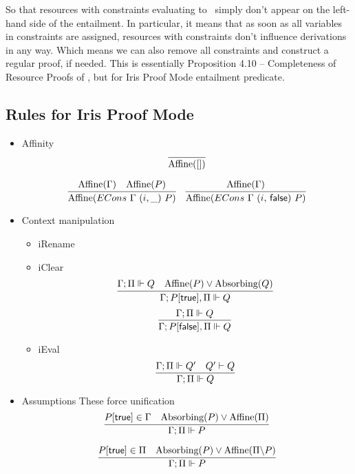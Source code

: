 {So that resources with constraints evaluating to \false~simply don't appear on the left-hand side of the entailment.
In particular, it means that as soon as all variables in constraints are assigned, resources with \false constraints don't influence derivations in any way.
Which means we can also remove all constraints and construct a regular proof, if needed.
This is essentially Proposition 4.10 -- Completeness of Resource Proofs of \citet[page~25]{harlandResourceDistributionBooleanConstraints2003}, but for Iris Proof Mode entailment predicate.

\subsection{Rules for Iris Proof Mode}


\begin{itemize}
\item Affinity
  \[
  \infer{\Affine{[]}}{}
  \]

  \begin{equation*}
  \infer{\Affine{ECons\ \Gamma\ (i,\_)\ P}}
        {\Affine{\Gamma} &
         \Affine{P}
       }
  \quad
  \infer{\Affine{ECons\ \Gamma\ (i,\, \false)\ P}}
        {\Affine{\Gamma}}
  \end{equation*}
\item Context manipulation
  \begin{itemize}
  \item iRename
  \item iClear
    \[
    \infer{\entails {\IntuD} {P[\true], \SpatD} {Q}}
          {\entailsD Q &
           \Affine{P} \vee \Absorbing{Q}}
    \]
    \[
    \infer{\entails {\IntuD} {P[\false], \SpatD} {Q}}
          {\entailsD Q}
    \]
  \item iEval
    \[
    \infer{\entailsD Q}
          {\entailsD Q' &
           Q' \vdash Q
          }
    \]
  \end{itemize}
\item Assumptions
  These force unification
  \[
  \infer{\entailsD P}
        {P[\true] \in \IntuD &
         \Absorbing{P} \vee \Affine{\SpatD}}
  \]

 \[
  \infer{\entailsD P}
        {P[\true] \in \SpatD &
         \Absorbing{P} \vee \Affine{\SpatD \backslash P}}
 \]


\end{itemize}}
